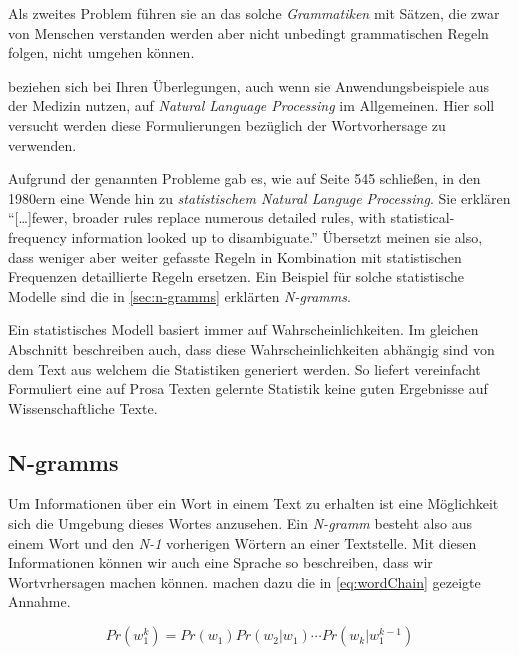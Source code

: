         Als zweites Problem führen sie an das solche \emph{Grammatiken} mit Sätzen, die zwar von Menschen verstanden werden aber nicht unbedingt grammatischen Regeln folgen, nicht umgehen können.
        
        \cite{jamia:introduction} beziehen sich bei Ihren Überlegungen, auch wenn sie Anwendungsbeispiele aus der Medizin nutzen, auf \emph{Natural Language Processing} im Allgemeinen. Hier soll versucht werden diese Formulierungen bezüglich der Wortvorhersage zu verwenden.
        
        Aufgrund der genannten Probleme gab es, wie \cite{jamia:introduction} auf Seite 545 schließen, in den 1980ern eine Wende hin zu \emph{statistischem Natural Languge Processing}. Sie erklären \enquote{[\dots]fewer, broader rules replace numerous detailed rules, with statistical-frequency information looked up to disambiguate.} Übersetzt meinen sie also, dass weniger aber weiter gefasste Regeln in Kombination mit statistischen Frequenzen detaillierte Regeln ersetzen. Ein Beispiel für solche statistische Modelle sind die in \autoref{sec:n-gramms} erklärten \emph{N-gramms}.
        
        Ein statistisches Modell basiert immer auf Wahrscheinlichkeiten. Im gleichen Abschnitt beschreiben \cite{jamia:introduction} auch, dass diese Wahrscheinlichkeiten abhängig sind von dem Text aus welchem die Statistiken generiert werden. So liefert vereinfacht Formuliert eine auf Prosa Texten gelernte Statistik keine guten Ergebnisse auf Wissenschaftliche Texte.  
        
    \newpage
    \subsection{N-gramms}
    \label{sec:n-gramms}
    
    	Um Informationen über ein Wort in einem Text zu erhalten ist eine Möglichkeit sich die Umgebung dieses Wortes anzusehen. Ein \emph{N-gramm} besteht also aus einem Wort und den \emph{N-1} vorherigen Wörtern an einer Textstelle. Mit diesen Informationen können wir auch eine Sprache so beschreiben, dass wir Wortvrhersagen machen können. \parencite[S. 468, Gleichung 1]{cumpatationalLinguistics:classBasedNGramms} machen dazu die in \autoref{eq:wordChain} gezeigte Annahme.
        
        \begin{equation}
        	Pr(w_1^k) = Pr(w_1) Pr(w_2|w_1) \cdots Pr(w_k|w_1^{k-1})
        	\label{eq:wordChain}
        \end{equation}
        
